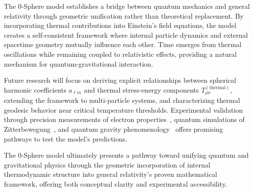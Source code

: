 \documentclass[%
 reprint,
 amsmath,amssymb,
 aps,
]{revtex4-1}
\numberwithin{equation}{section}%
\begin{document}
The 0-Sphere model establishes a bridge between quantum mechanics and general relativity through geometric unification rather than theoretical replacement. By incorporating thermal contributions into Einstein's field equations, the model creates a self-consistent framework where internal particle dynamics and external spacetime geometry mutually influence each other. Time emerges from thermal oscillations while remaining coupled to relativistic effects, providing a natural mechanism for quantum-gravitational interaction.

Future research will focus on deriving explicit relationships between spherical harmonic coefficients $a_{\ell m}$ and thermal stress-energy components $T_{\mu\nu}^{(\text{thermal})}$, extending the framework to multi-particle systems, and characterizing thermal geodesic behavior near critical temperature thresholds. Experimental validation through precision measurements of electron properties~\cite{fan2023}, quantum simulations of Zitterbewegung~\cite{gerritsma2010, leblanc2013}, and quantum gravity phenomenology~\cite{amelino-camelia2002} offers promising pathways to test the model's predictions.

The 0-Sphere model ultimately presents a pathway toward unifying quantum and gravitational physics through the geometric incorporation of internal thermodynamic structure into general relativity's proven mathematical framework, offering both conceptual clarity and experimental accessibility.
\end{document}
